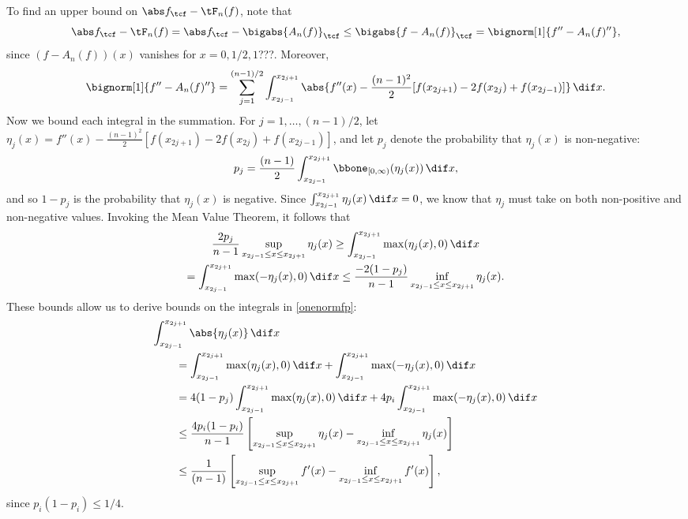 To find an upper bound on $\Ftnorm{f}-\tF_{n}(f)$, note that
\begin{equation*}
\Ftnorm{f} - \tF_{n}(f) = \Ftnorm{f} - \bigabs{A_n(f)}_{\tcf} \le \bigabs{f-A_n(f)}_{\tcf} = \bignorm[1]{f'' -A_n(f)''},
\end{equation*}
since $(f-A_n(f))(x)$ vanishes for $x=0,1/2,1$???.  Moreover,
\begin{equation} \label{onenormfp}
\bignorm[1]{f'' -A_n(f)''} = \sum_{j=1}^{(n-1)/2} \int_{x_{2j-1}}^{x_{2j+1}} \abs{f''(x) -\frac{(n-1)^2}{2}[f(x_{2j+1})-2f(x_{2j})+f(x_{2j-1})]} \, \dif x.
\end{equation}
Now we bound each integral in the summation.  For $j=1, \ldots, (n-1)/2$, let $\eta_j(x) = f''(x) -\frac{(n-1)^2}{2}[f(x_{2j+1})-2f(x_{2j})+f(x_{2j-1})]$, and let $p_j$ denote the probability that $\eta_j(x)$ is non-negative:
\[
p_j = \frac{(n-1)}{2}\int_{x_{2j-1}}^{x_{2j+1}} \bbone_{[0,\infty)} (\eta_j(x)) \, \dif x,
\]
and so $1-p_j$ is the probability that $\eta_j(x)$ is negative.  Since $\int_{x_{2j-1}}^{x_{2j+1}} \eta_j(x) \, \dif x =0$, we know that $\eta_j$ must take on both non-positive and non-negative values.  Invoking the Mean Value Theorem, it follows that
\begin{multline*}
\frac{2p_j}{n-1} \sup_{x_{2j-1} \le x \le x_{2j+1}} \eta_j(x) \ge \int_{x_{2j-1}}^{x_{2j+1}} \max(\eta_j(x),0) \, \dif x \\
= \int_{x_{2j-1}}^{x_{2j+1}} \max(-\eta_j(x),0) \, \dif x \le \frac{-2(1-p_j)}{n-1} \inf_{x_{2j-1} \le x \le x_{2j+1}} \eta_j(x) .
\end{multline*}
These bounds allow us to derive bounds on the integrals in \eqref{onenormfp}:
\begin{align*}
\MoveEqLeft{\int_{x_{2j-1}}^{x_{2j+1}} \abs{\eta_j(x)} \, \dif x} \\
 &= \int_{x_{2j-1}}^{x_{2j+1}} \max(\eta_j(x),0) \, \dif x + \int_{x_{2j-1}}^{x_{2j+1}} \max(-\eta_j(x),0) \, \dif x\\
&=4(1-p_j) \int_{x_{2j-1}}^{x_{2j+1}} \max(\eta_j(x),0) \, \dif x + 4p_i\int_{x_{2j-1}}^{x_{2j+1}} \max(-\eta_j(x),0) \, \dif x\\
&\le \frac{4p_i(1-p_i)}{n-1} \left[ \sup_{x_{2j-1} \le x \le x_{2j+1}} \eta_j(x) - \inf_{x_{2j-1} \le x \le x_{2j+1}} \eta_j(x) \right]\\
&\le\frac{1}{(n-1)} \left[ \sup_{x_{2j-1} \le x \le x_{2j+1}} f'(x) - \inf_{x_{2j-1} \le x \le x_{2j+1}} f'(x) \right],
\end{align*}
since $p_i(1-p_i)\le 1/4$.

